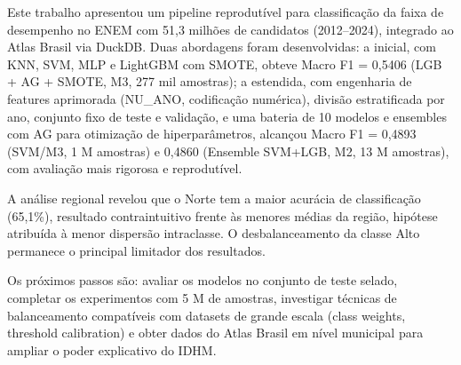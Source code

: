 \documentclass[12pt]{article}
\begin{document}
Este trabalho apresentou um pipeline reprodutível para classificação da
faixa de desempenho no ENEM com 51,3 milhões de candidatos (2012--2024),
integrado ao Atlas Brasil via DuckDB. Duas abordagens foram desenvolvidas:
a inicial, com KNN, SVM, MLP e LightGBM com SMOTE, obteve Macro F1 =
0,5406 (LGB + AG + SMOTE, M3, 277 mil amostras); a estendida, com
engenharia de features aprimorada (NU\_ANO, codificação numérica),
divisão estratificada por ano, conjunto fixo de teste e validação, e uma
bateria de 10 modelos e ensembles com AG para otimização de
hiperparâmetros, alcançou Macro F1 = 0,4893 (SVM/M3, 1 M amostras) e
0,4860 (Ensemble SVM+LGB, M2, 13 M amostras), com avaliação mais
rigorosa e reprodutível.

A análise regional revelou que o Norte tem a maior acurácia de
classificação (65,1\%), resultado contraintuitivo frente às menores médias
da região, hipótese atribuída à menor dispersão intraclasse. O
desbalanceamento da classe Alto permanece o principal limitador dos
resultados.

Os próximos passos são: avaliar os modelos no conjunto de teste selado,
completar os experimentos com 5 M de amostras, investigar técnicas de
balanceamento compatíveis com datasets de grande escala (class weights,
threshold calibration) e obter dados do Atlas Brasil em nível municipal
para ampliar o poder explicativo do IDHM.



\end{document}
